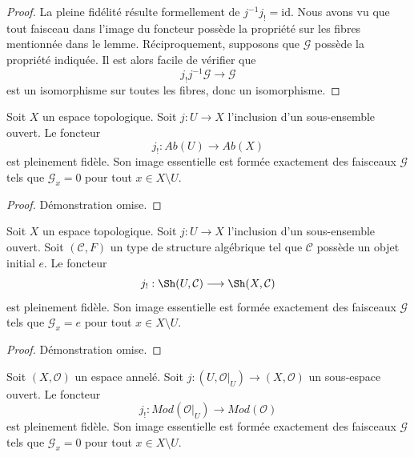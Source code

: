 \begin{proof}
La pleine fidélité résulte formellement de $j^{-1} j_! = \text{id}$.
Nous avons vu que tout faisceau dans l'image du foncteur possède
la propriété sur les fibres mentionnée dans le lemme. Réciproquement, supposons
que $\mathcal{G}$ possède la propriété indiquée.
Il est alors facile de vérifier que
$$
j_! j^{-1} \mathcal{G} \to \mathcal{G}
$$
est un isomorphisme sur toutes les fibres, donc un isomorphisme.
\end{proof}

\begin{lemma}
\label{lemma-equivalence-categories-open-abelian}
Soit $X$ un espace topologique.
Soit $j : U \to X$ l'inclusion d'un sous-ensemble ouvert.
Le foncteur
$$
j_! : \textit{Ab}(U) \longrightarrow \textit{Ab}(X)
$$
est pleinement fidèle. Son image essentielle est formée exactement
des faisceaux $\mathcal{G}$ tels que
$\mathcal{G}_x = 0$ pour tout $x \in X \setminus U$.
\end{lemma}

\begin{proof}
Démonstration omise.
\end{proof}

\begin{lemma}
\label{lemma-equivalence-categories-open-structures}
Soit $X$ un espace topologique.
Soit $j : U \to X$ l'inclusion d'un sous-ensemble ouvert.
Soit $(\mathcal{C}, F)$ un type de structure algébrique
tel que $\mathcal{C}$ possède un objet initial $e$.
Le foncteur
$$
j_! : \Sh(U, \mathcal{C}) \longrightarrow \Sh(X, \mathcal{C})
$$
est pleinement fidèle. Son image essentielle est formée exactement
des faisceaux $\mathcal{G}$ tels que
$\mathcal{G}_x = e$ pour tout $x \in X \setminus U$.
\end{lemma}

\begin{proof}
Démonstration omise.
\end{proof}


\begin{lemma}
\label{lemma-equivalence-categories-open-modules}
Soit $(X, \mathcal{O})$ un espace annelé.
Soit $j : (U, \mathcal{O}|_U) \to (X, \mathcal{O})$
un sous-espace ouvert.
Le foncteur
$$
j_! : \textit{Mod}(\mathcal{O}|_U) \longrightarrow \textit{Mod}(\mathcal{O})
$$
est pleinement fidèle. Son image essentielle est formée exactement
des faisceaux $\mathcal{G}$ tels que
$\mathcal{G}_x = 0$ pour tout $x \in X \setminus U$.
\end{lemma}

